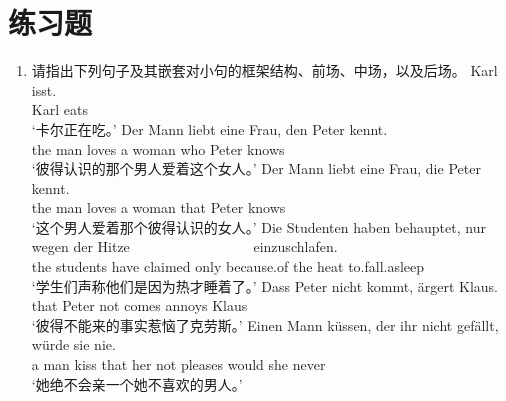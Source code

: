 %


\section*{练习题}
\begin{enumerate}
\item 请指出下列句子及其嵌套对小句的框架结构、前场、中场，以及后场。
\eal
\ex 
\gll Karl isst.\\
	 Karl eats\\
\glt `卡尔正在吃。'
\ex 
\gll Der Mann liebt eine Frau, den Peter kennt.\\
     the man  loves a woman who Peter knows\\
\glt `彼得认识的那个男人爱着这个女人。'
\ex 
\gll Der Mann liebt eine Frau, die Peter kennt.\\
	 the man loves a woman that Peter knows\\
\glt `这个男人爱着那个彼得认识的女人。'
\ex 
\gll Die Studenten haben behauptet, nur wegen der Hitze~~~~~~~~~~~~~~~~~ einzuschlafen.\\
	 the students have claimed only because.of the heat to.fall.asleep\\
\glt `学生们声称他们是因为热才睡着了。'
\ex 
\gll Dass Peter nicht kommt, ärgert Klaus.\\
	 that Peter not comes annoys Klaus\\
\glt `彼得不能来的事实惹恼了克劳斯。'
\ex 
\gll Einen Mann küssen, der ihr nicht gefällt, würde sie nie.\\
	 a man kiss that her not pleases would she never\\
\glt `她绝不会亲一个她不喜欢的男人。'
\zl
\end{enumerate}

